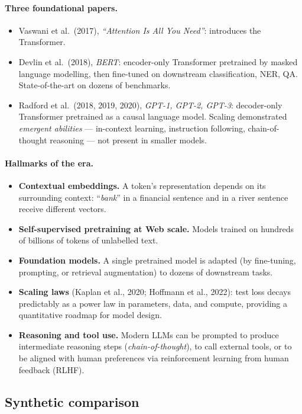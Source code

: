 \paragraph{Three foundational papers.}
\begin{itemize}
    \item Vaswani et al.\ (2017), \emph{``Attention Is All You Need''}: introduces the Transformer.
    \item Devlin et al.\ (2018), \emph{BERT}: encoder-only Transformer pretrained by masked language modelling, then fine-tuned on downstream classification, NER, QA. State-of-the-art on dozens of benchmarks.
    \item Radford et al.\ (2018, 2019, 2020), \emph{GPT-1, GPT-2, GPT-3}: decoder-only Transformer pretrained as a causal language model. Scaling demonstrated \emph{emergent abilities} --- in-context learning, instruction following, chain-of-thought reasoning --- not present in smaller models.
\end{itemize}

\paragraph{Hallmarks of the era.}
\begin{itemize}
    \item \textbf{Contextual embeddings.} A token's representation depends on its surrounding context: ``\emph{bank}'' in a financial sentence and in a river sentence receive different vectors.
    \item \textbf{Self-supervised pretraining at Web scale.} Models trained on hundreds of billions of tokens of unlabelled text.
    \item \textbf{Foundation models.} A single pretrained model is adapted (by fine-tuning, prompting, or retrieval augmentation) to dozens of downstream tasks.
    \item \textbf{Scaling laws} (Kaplan et al., 2020; Hoffmann et al., 2022): test loss decays predictably as a power law in parameters, data, and compute, providing a quantitative roadmap for model design.
    \item \textbf{Reasoning and tool use.} Modern LLMs can be prompted to produce intermediate reasoning steps (\emph{chain-of-thought}), to call external tools, or to be aligned with human preferences via reinforcement learning from human feedback (RLHF).
\end{itemize}

\subsection{Synthetic comparison}

